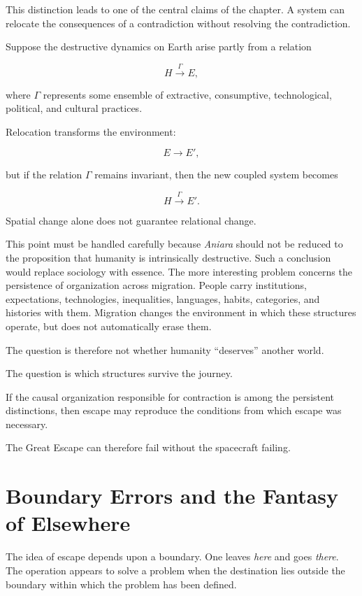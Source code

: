 \documentclass[11pt,oneside]{book}
\theoremstyle{definition}
\theoremstyle{remark}
\begin{document}
This distinction leads to one of the central claims of the chapter. A system can relocate the consequences of a contradiction without resolving the contradiction.

Suppose the destructive dynamics on Earth arise partly from a relation

\[
H\overset{\Gamma}{\longrightarrow}E,
\]

where \(\Gamma\) represents some ensemble of extractive, consumptive, technological, political, and cultural practices.

Relocation transforms the environment:

\[
E\rightarrow E',
\]

but if the relation \(\Gamma\) remains invariant, then the new coupled system becomes

\[
H\overset{\Gamma}{\longrightarrow}E'.
\]

Spatial change alone does not guarantee relational change.

This point must be handled carefully because \emph{Aniara} should not be reduced to the proposition that humanity is intrinsically destructive. Such a conclusion would replace sociology with essence. The more interesting problem concerns the persistence of organization across migration. People carry institutions, expectations, technologies, inequalities, languages, habits, categories, and histories with them. Migration changes the environment in which these structures operate, but does not automatically erase them.

The question is therefore not whether humanity ``deserves'' another world.

The question is which structures survive the journey.

If the causal organization responsible for contraction is among the persistent distinctions, then escape may reproduce the conditions from which escape was necessary.

The Great Escape can therefore fail without the spacecraft failing.

\section{Boundary Errors and the Fantasy of Elsewhere}

The idea of escape depends upon a boundary. One leaves \emph{here} and goes \emph{there}. The operation appears to solve a problem when the destination lies outside the boundary within which the problem has been defined.
\end{document}
